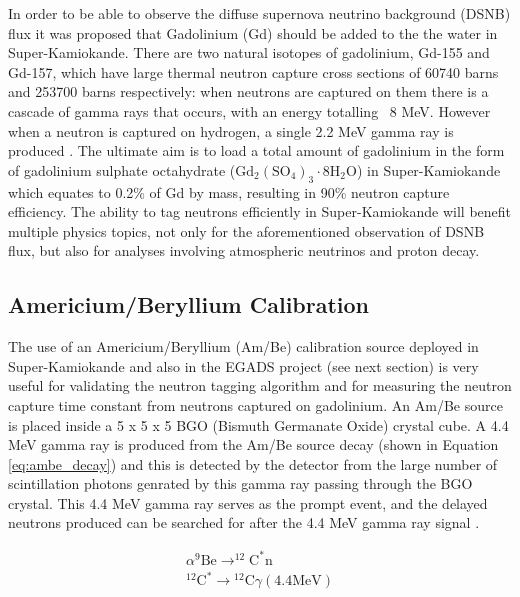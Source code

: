 In order to be able to observe the diffuse supernova neutrino background (DSNB) flux it was proposed that Gadolinium (Gd) should be added to the the water in Super-Kamiokande. There are two natural isotopes of gadolinium, Gd-155 and Gd-157, which have large thermal neutron capture cross sections of 60740 barns and 253700 barns respectively: when neutrons are captured on them there is a cascade of gamma rays that occurs, with an energy totalling ~8 MeV. However when a neutron is captured on hydrogen, a single 2.2 MeV gamma ray is produced \cite{meo_measurement_nodate}.  The ultimate aim is to load a total amount of gadolinium in the form of gadolinium sulphate octahydrate ($
\mathrm{Gd}_{2}\left(\mathrm{SO}_{4}\right)_{3} \cdot 8 \mathrm{H}_{2} \mathrm{O}$) in Super-Kamiokande which equates to 0.2\% of Gd by mass, resulting in 90\% neutron capture efficiency. The ability to tag neutrons efficiently in Super-Kamiokande will benefit multiple physics topics, not only for the aforementioned observation of DSNB flux, but also for analyses involving atmospheric neutrinos and proton decay. 

\subsection{Americium/Beryllium Calibration}

The use of an Americium/Beryllium (Am/Be) calibration source deployed in Super-Kamiokande and also in the EGADS project (see next section) is very useful for validating the neutron tagging algorithm and for measuring the neutron capture time constant from neutrons captured on gadolinium. An Am/Be source is placed inside a 5 x 5 x 5 BGO (Bismuth Germanate Oxide) crystal cube. A 4.4 MeV gamma ray is produced from the Am/Be source decay (shown in Equation \ref{eq:ambe_decay}) and this is detected by the detector from the large number of scintillation photons genrated by this gamma ray passing through the BGO crystal. This 4.4 MeV gamma ray serves as the prompt event, and the delayed neutrons produced can be searched for after the 4.4 MeV gamma ray signal \cite{abe2022neutron}.

\begin{equation}
\begin{array}{c}
\alpha^{9} \mathrm{Be} \longrightarrow^{12} \mathrm{C}^{*} \mathrm{n} \\
{ }^{12} \mathrm{C}^{*} \longrightarrow{ }^{12} \mathrm{C} \gamma(4.4 \mathrm{MeV})
\end{array}
\label{eq:ambe_decay}
\end{equation}


